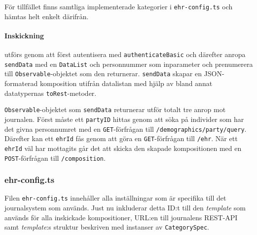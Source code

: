 \documentclass[techdoc/techdoc.tex]{subfiles}
\begin{document}
För tillfället finns samtliga implementerade kategorier i
\texttt{ehr-config.ts} och hämtas helt enkelt därifrån.

\paragraph{Inskickning} utförs genom att först autentisera med
\texttt{authenticateBasic} och därefter anropa \texttt{sendData} med en
\texttt{DataList} och personnummer som inparameter och prenumerera till
\texttt{Observable}-objektet som den returnerar. \texttt{sendData} skapar en
JSON-formaterad komposition utifrån datalistan med hjälp av bland annat
datatypernas \texttt{toRest}-metoder.

\texttt{Observable}-objektet som \texttt{sendData} returnerar utför totalt tre
anrop mot journalen. Först måste ett \texttt{partyID} hittas genom att söka på
individer som har det givna personnumret med en \texttt{GET}-förfrågan till
\texttt{/demographics/party/query}. Därefter kan ett \texttt{ehrId} fås genom
att göra en \texttt{GET}-förfrågan till \texttt{/ehr}. När ett \texttt{ehrId}
väl har mottagits går det att skicka den skapade kompositionen med en
\texttt{POST}-förfrågan till \texttt{/composition}.


\subsubsection{ehr-config.ts}
Filen \texttt{ehr-config.ts} innehåller alla inställningar som är specifika
till det journalsystem som används. Just nu inkluderar detta ID:t till den \emph{template}
som används för alla inskickade kompositioner, URL:en till journalens REST-API
samt \emph{template}:s struktur beskriven med instanser av \texttt{CategorySpec}.
\end{document}
